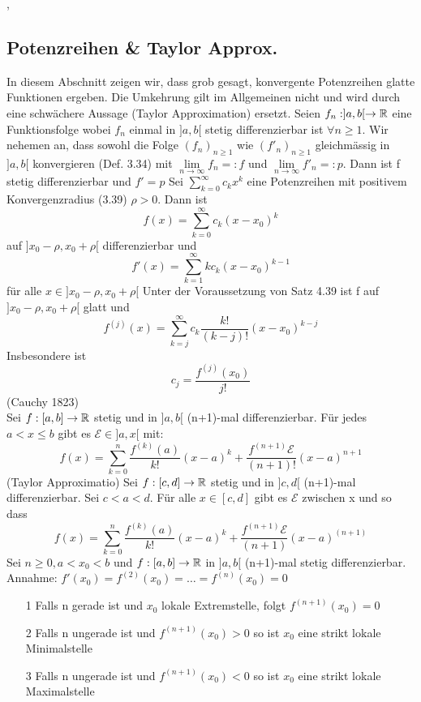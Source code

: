 \sep
\subsection{Potenzreihen \& Taylor Approx.}
In diesem Abschnitt zeigen wir, dass grob gesagt, konvergente Potenzreihen glatte Funktionen ergeben. Die Umkehrung gilt im Allgemeinen nicht und wird durch eine schwächere Aussage (Taylor Approximation) ersetzt. \newline
\Satz[4.39] Seien  \(f_n: ]a,b[ \rightarrow \mathbb{R} \) eine Funktionsfolge wobei \(f_n\) einmal in \(]a,b[\) stetig differenzierbar ist \( \forall n \geq 1\). Wir nehemen an, dass sowohl die Folge \((f_n)_{n \geq 1}\) wie \((f'_n)_{n \geq 1}\) gleichmässig in \(]a,b[\) konvergieren (Def. 3.34) mit \(\lim\limits_{n \rightarrow \infty} f_n =: f \) und \(\lim\limits_{n \rightarrow \infty} f'_n =: p \). \newline
Dann ist f stetig differenzierbar und \(f' = p\) \newline
\Satz[4.40] Sei \(\sum_{k=0}^\infty c_kx^k\) eine Potenzreihen mit positivem Konvergenzradius (3.39) \(\rho > 0\). Dann ist
\[f(x) = \sum_{k=0}^\infty c_k(x - x_0)^k\]
auf \(] x_0 - \rho, x_0 + \rho [\) differenzierbar und
\[f'(x) = \sum_{k=1}^\infty kc_k(x - x_0)^{k-1}\]
für alle \( x \in ]x_0 - \rho , x_0 + \rho [\) \newline
\Korollar[4.41] Unter der Voraussetzung von Satz 4.39 ist f auf \(] x_0 - \rho, x_0 + \rho[ \) glatt und
\[f^{(j)}(x) = \sum_{k=j}^\infty c_k \frac{k!}{(k-j)!}(x - x_0)^{k-j}\]
Insbesondere ist
\[c_j = \frac{f^{(j)}(x_0)}{j!}\]
\Bsp[4.42](Cauchy 1823)
\[ \]
 Sei \(f: [a,b] \rightarrow \mathbb{R}\) stetig und in \(]a,b[\) (n+1)-mal differenzierbar. Für jedes \(a < x \leq b \) gibt es \(\mathcal{E} \in ]a,x[ \) mit:
\[ f(x) = \sum_{k=0}^n \frac{f^{(k)}(a)}{k!}(x -a)^k + \frac{f^{(n+1)}\mathcal{E}}{(n+1)!}(x - a)^{n+1} \]
 (Taylor Approximatio)
Sei \(f : [c,d] \rightarrow \mathbb{R} \) stetig und in \(]c,d[ \) (n+1)-mal differenzierbar. Sei \( c < a < d\). Für alle \(x \in [c,d]\) gibt es \( \mathcal{E}\) zwischen x und so dass
\[f(x) = \sum_{k=0}^n \frac{f^{(k)}(a)}{k!} (x-a)^k + \frac{f^{(n+1)}\mathcal{E}}{(n+1)} (x-a)^{(n+1)}\]
 Sei \( n \geq 0,  a < x_0 < b \) und \(f: [a,b] \rightarrow \mathbb{R}\) in \(]a,b[\) (n+1)-mal stetig differenzierbar. Annahme: \(f'(x_0) = f^{(2)}(x_0) = \dots = f^{(n)}(x_0) = 0\)
\begin{enumerate}
    \item [1] Falls n gerade ist und \(x_0\) lokale Extremstelle, folgt \(f^{(n+1)}(x_0) = 0\)
    \item [2] Falls n ungerade ist und \(f^{(n+1)}(x_0) > 0\) so ist \(x_0\) eine strikt lokale Minimalstelle
    \item [3] Falls n ungerade ist und \(f^{(n+1)}(x_0) < 0\) so ist \(x_0\) eine strikt lokale Maximalstelle
\end{enumerate}
